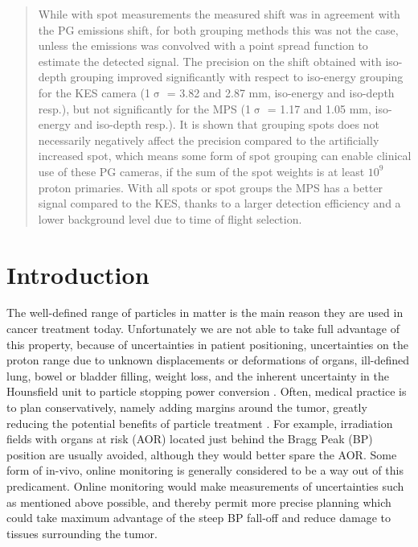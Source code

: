 \documentclass[a4paper,english]{article}
\begin{document}
\begin{abstract}
While with spot measurements the measured shift was in agreement with the PG emissions shift, for both grouping methods this was not the case, unless the emissions was convolved with a point spread function to estimate the detected signal. The precision on the shift obtained with iso-depth grouping improved significantly with respect to iso-energy grouping for the KES camera (1$\upsigma$ = 3.82 and 2.87 mm, iso-energy and iso-depth resp.), but not significantly for the MPS (1$\upsigma$ = 1.17 and 1.05 mm, iso-energy and iso-depth resp.). It is shown that grouping spots does not necessarily negatively affect the precision compared to the artificially increased spot, which means some form of spot grouping can enable clinical use of these PG cameras, if the sum of the spot weights is at least $10^9$ proton primaries. With all spots or spot groups the MPS has a better signal compared to the KES, thanks to a larger detection efficiency and a lower background level due to time of flight selection.

\end{abstract}


\section{Introduction}

The well-defined range of particles in matter is the main reason they are used in cancer treatment today. Unfortunately we are not able to take full advantage of this property, because of uncertainties in patient positioning, uncertainties on the proton range due to unknown displacements or deformations of organs, ill-defined lung, bowel or bladder filling, weight loss, and the inherent uncertainty in the Hounsfield unit to particle stopping power conversion \citep{Paganetti2013}. Often, medical practice is to plan conservatively, namely adding margins around the tumor, greatly reducing the potential benefits of particle treatment \citep{Knopf2013}. For example, irradiation fields with organs at risk (AOR) located just behind the Bragg Peak (BP) position are usually avoided, although they would better spare the AOR. Some form of in-vivo, online monitoring is generally considered to be a way out of this predicament. Online monitoring would make measurements of uncertainties such as mentioned above possible, and thereby permit more precise planning which could take maximum advantage of the steep BP fall-off and reduce damage to tissues surrounding the tumor.
\end{document}
